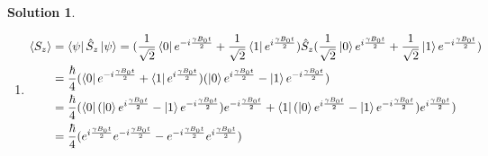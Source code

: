 \documentclass[10pt]{article}
\theoremstyle{definition}
\newtheorem{soln}{Solution}
\begin{document}
\begin{soln}
\begin{enumerate}[label=(\alph*)]
\begin{align*}
                               & =\frac{\hbar}{4}(\bra{0}e^{-i\frac{\gamma B_0t}{2}}+\bra{1}e^{i\frac{\gamma B_0t}{2}})
            (i\ket{1}e^{i\frac{\gamma B_0t}{2}}-i\ket{0}e^{-i\frac{\gamma B_0t}{2}})                                                                                                                                                                                      \\
                               & =\frac{\hbar}{4}(\bra{0}(i\ket{1}e^{i\frac{\gamma B_0t}{2}}-i\ket{0}e^{-i\frac{\gamma B_0t}{2}}) e^{-i\frac{\gamma B_0t}{2}}+\bra{1}(i\ket{1}e^{i\frac{\gamma B_0t}{2}}-i\ket{0}e^{-i\frac{\gamma B_0t}{2}}) e^{i\frac{\gamma B_0t}{2}}) \\
                               & =\frac{\hbar}{4}((-ie^{-i\frac{\gamma B_0t}{2}}) e^{-i\frac{\gamma B_0t}{2}}+(ie^{i\frac{\gamma B_0t}{2}}) e^{i\frac{\gamma B_0t}{2}})                                                                                                   \\
                               & =\frac{i\hbar}{4}(e^{i\gamma B_0t}-e^{-i\gamma B_0t})=\frac{\hbar}{2}\sin(\gamma B_0t)
          \end{align*}
    \item \begin{align*}
            \langle S_z\rangle & =\bra{\psi}\hat{S}_z\ket{\psi}=(\frac{1}{\sqrt{2}}\bra{0}e^{-i\frac{\gamma B_0t}{2}}+\frac{1}{\sqrt{2}}\bra{1}e^{i\frac{\gamma B_0t}{2}})
            \hat{S}_z(\frac{1}{\sqrt{2}}\ket{0}e^{i\frac{\gamma B_0t}{2}}+\frac{1}{\sqrt{2}}\ket{1}e^{-i\frac{\gamma B_0t}{2}})                                                                                                                                     \\
                               & =\frac{\hbar}{4}(\bra{0}e^{-i\frac{\gamma B_0t}{2}}+\bra{1}e^{i\frac{\gamma B_0t}{2}})
            (\ket{0}e^{i\frac{\gamma B_0t}{2}}-\ket{1}e^{-i\frac{\gamma B_0t}{2}})                                                                                                                                                                                  \\
                               & =\frac{\hbar}{4}(\bra{0}(\ket{0}e^{i\frac{\gamma B_0t}{2}}-\ket{1}e^{-i\frac{\gamma B_0t}{2}})e^{-i\frac{\gamma B_0t}{2}}+\bra{1}(\ket{0}e^{i\frac{\gamma B_0t}{2}}-\ket{1}e^{-i\frac{\gamma B_0t}{2}})e^{i\frac{\gamma B_0t}{2}}) \\
                               & =\frac{\hbar}{4}(e^{i\frac{\gamma B_0t}{2}}e^{-i\frac{\gamma B_0t}{2}}-e^{-i\frac{\gamma B_0t}{2}}e^{i\frac{\gamma B_0t}{2}})                                                                                                      \\

\end{align*}
\end{enumerate}
\end{soln}
\end{document}
